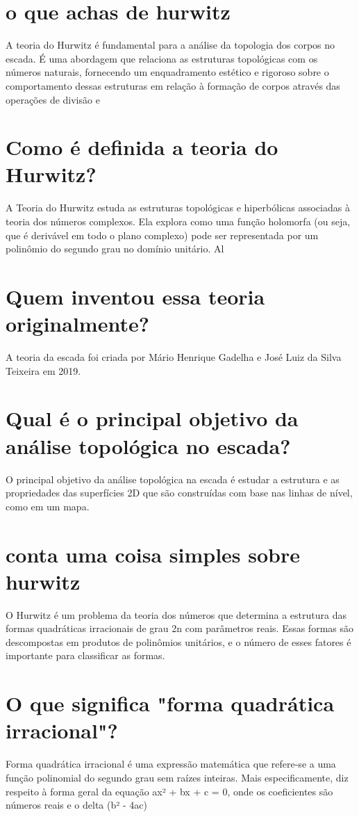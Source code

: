 \documentclass[11pt,a4paper]{article}
\begin{document}
\section{o que achas de hurwitz}
A teoria do Hurwitz é fundamental para a análise da topologia dos corpos no escada. É uma abordagem que relaciona as estruturas topológicas com os números naturais, fornecendo um enquadramento estético e rigoroso sobre o comportamento dessas estruturas em relação à formação de corpos através das operações de divisão e

\section{Como é definida a teoria do Hurwitz?}
A Teoria do Hurwitz estuda as estruturas topológicas e hiperbólicas associadas à teoria dos números complexos. Ela explora como uma função holomorfa (ou seja, que é derivável em todo o plano complexo) pode ser representada por um polinômio do segundo grau no domínio unitário. Al

\section{Quem inventou essa teoria originalmente?}
A teoria da escada foi criada por Mário Henrique Gadelha e José Luiz da Silva Teixeira em 2019.

\section{Qual é o principal objetivo da análise topológica no escada?}
O principal objetivo da análise topológica na escada é estudar a estrutura e as propriedades das superfícies 2D que são construídas com base nas linhas de nível, como em um mapa.

\section{conta uma coisa simples sobre hurwitz}
O Hurwitz é um problema da teoria dos números que determina a estrutura das formas quadráticas irracionais de grau 2n com parâmetros reais. Essas formas são descompostas em produtos de polinômios unitários, e o número de esses fatores é importante para classificar as formas.

\section{O que significa "forma quadrática irracional"?}
Forma quadrática irracional é uma expressão matemática que refere-se a uma função polinomial do segundo grau sem raízes inteiras. Mais especificamente, diz respeito à forma geral da equação ax² + bx + c = 0, onde os coeficientes são números reais e o delta (b² - 4ac)
\end{document}
